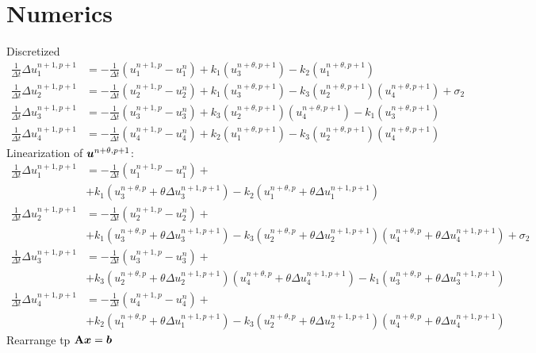 \documentclass[biblatex]{mooiman_memo}
\newcommand{\Dt}{\Delta t}
\renewcommand{\vec}[1]{\mbox{\boldmath $#1$} }
\newcommand{\mat}[1]{\mbox{\boldmath ${\rm #1}$} }
\begin{document}
\section{Numerics}
Discretized
\begin{align}
    \frac{1}{\Dt}\Delta u_1^{n+1, p+1} & = - \frac{1}{\Dt}(u_1^{n+1,p} - u_1^n) + k_1 (u_3^{n+\theta,p+1}) - k_2 (u_1^{n+\theta,p+1})
    \\
    \frac{1}{\Dt}\Delta u_2^{n+1, p+1} & = - \frac{1}{\Dt}(u_2^{n+1,p} - u_2^n) + k_1(u_3^{n+\theta,p+1}) - k_3 (u_2^{n+\theta,p+1}) (u_4^{n+\theta,p+1}) +\sigma_2
    \\
    \frac{1}{\Dt}\Delta u_3^{n+1, p+1} & = - \frac{1}{\Dt}(u_3^{n+1,p} - u_3^n) + k_3 (u_2^{n+\theta,p+1}) (u_4^{n+\theta,p+1}) - k_1(u_3^{n+\theta,p+1})
    \\
    \frac{1}{\Dt}\Delta u_4^{n+1, p+1} & = - \frac{1}{\Dt}(u_4^{n+1,p} - u_4^n) + k_2(u_1^{n+\theta,p+1}) - k_3 (u_2^{n+\theta,p+1}) (u_4^{n+\theta,p+1})
\end{align}
Linearization of $\vec{u}^{n+\theta,p+1}$:
\begin{align}
    \frac{1}{\Dt}\Delta u_1^{n+1, p+1} & =
    - \frac{1}{\Dt}(u_1^{n+1,p} - u_1^n) + \\
    & + k_1 (u_3^{n+\theta,p} + \theta \Delta u_3^{n+1, p+1}) - k_2 (u_1^{n+\theta,p} + \theta \Delta u_1^{n+1, p+1})
    \\
    \frac{1}{\Dt}\Delta u_2^{n+1, p+1} & = - \frac{1}{\Dt}(u_2^{n+1,p} - u_2^n) +
    \\
    & + k_1(u_3^{n+\theta,p} + \theta \Delta u_3^{n+1, p+1}) - k_3 (u_2^{n+\theta,p} + \theta \Delta u_2^{n+1, p+1}) (u_4^{n+\theta,p} + \theta \Delta u_4^{n+1, p+1}) +\sigma_2
    \\
    \frac{1}{\Dt}\Delta u_3^{n+1, p+1} & = - \frac{1}{\Dt}(u_3^{n+1,p} - u_3^n) +
    \\
    & +  k_3 (u_2^{n+\theta,p} + \theta \Delta u_2^{n+1, p+1}) (u_4^{n+\theta,p} + \theta \Delta u_4^{n+1, p+1}) - k_1(u_3^{n+\theta,p} + \theta \Delta u_3^{n+1, p+1})
    \\
    \frac{1}{\Dt}\Delta u_4^{n+1, p+1} & = - \frac{1}{\Dt}(u_4^{n+1,p} - u_4^n) +
    \\
    & + k_2(u_1^{n+\theta,p} + \theta \Delta u_1^{n+1, p+1}) - k_3 (u_2^{n+\theta,p} + \theta \Delta u_2^{n+1, p+1}) (u_4^{n+\theta,p} + \theta \Delta u_4^{n+1, p+1})
\end{align}
Rearrange tp $\mat{A}\vec{x}=\vec{b}$
\end{document}
